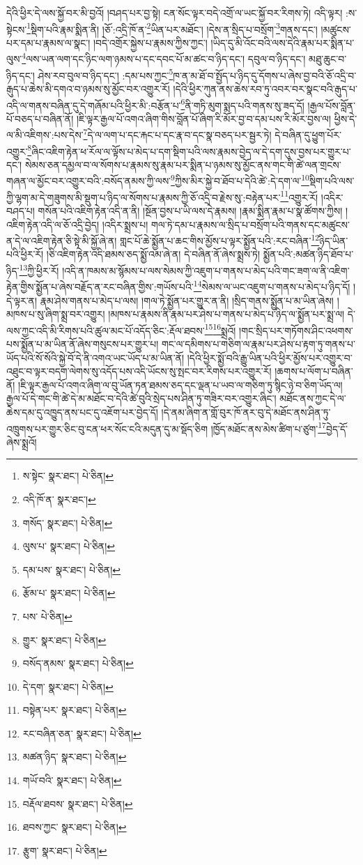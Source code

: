 དེའི་ཕྱིར་དེ་ལས་སྐྱོ་བར་མི་བྱའོ། །བཤད་པར་བྱ་སྟེ། ངན་སོང་ལྟར་བདེ་འགྲོ་ལ་ཡང་སྐྱོ་བར་རིགས་ཏེ། འདི་ལྟར། :ས་སྟེངས་\footnote{ས་སྟེང་  སྣར་ཐང་།  པེ་ཅིན། }སྡིག་པའི་རྣམ་སྨིན་ནི། །ཅོ་:འདྲི་ཁོ་ན་\footnote{འདི་ཁོ་ན་  སྣར་ཐང་། }ཡིན་པར་མཐོང་། །དེས་ན་སྲིད་པ་བསྲོག་\footnote{གསོད་  སྣར་ཐང་།  པེ་ཅིན། }གནས་དང་། །མཚུངས་པར་དམ་པ་རྣམས་ལ་སྣང་། །བདེ་འགྲོར་སྐྱེས་པ་རྣམས་ཀྱིས་ཀྱང་། །ཡིད་དུ་མི་འོང་བའི་ལས་དེའི་རྣམ་པར་སྨིན་པ་ལུས་\footnote{ལུས་པ་  སྣར་ཐང་།  པེ་ཅིན། }ལས་ཡན་ལག་དང་ཉིང་ལག་ཉམས་པ་དང་དབང་པོ་མ་ཚང་བ་ཉིད་དང་། དབུལ་བ་ཉིད་དང་། མཐུ་ཆུང་བ་ཉིད་དང་། ཤེས་རབ་བུལ་བ་ཉིད་དང་། :དམ་པས་ཀྱང་\footnote{དམ་པས་  སྣར་ཐང་།  པེ་ཅིན། }ཁ་ན་མ་ཐོ་བ་སྤྱོད་པ་ཉིད་དུ་དོགས་པ་ཞེས་བྱ་བའི་ཅོ་འདྲི་བ་རྒུད་པ་ཆེས་མི་དགའ་བ་ཉམས་སུ་མྱོང་བར་འགྱུར་རོ། །དེའི་ཕྱིར་ཀུན་ནས་ཆེས་རབ་ཏུ་འབར་བར་སྣང་བའི་རྒུད་པ་འདི་ལ་གནས་བཞིན་དུ་དེ་གཞོམ་པའི་ཕྱིར་མི་:བརྩོན་པ་\footnote{རྩོམ་པ་  སྣར་ཐང་།  པེ་ཅིན། }ནི་གཏི་མུག་སྨད་པའི་གནས་སུ་ཟད་དོ། །རྒྱལ་པོས་བློན་པོ་བཅད་པ་བཞིན་ནོ། །ཇི་ལྟར་རྒྱལ་པོ་འགའ་ཞིག་གིས་བློན་པོ་ཞིག་རི་མོར་བྱ་བ་དམ་པས་རི་མོར་བྱས་ལ། ཕྱིས་དེ་ལ་མི་འཇིགས་:པས་དེས་\footnote{པས་  པེ་ཅིན། }དེ་ལ་ལག་པ་དང་རྐང་པ་དང་རྣ་བ་དང་སྣ་བཅད་པར་སྦྱར་ཏེ། དེ་བཞིན་དུ་ཕྱུག་པོར་འགྱུར་\footnote{གྱུར་  སྣར་ཐང་།  པེ་ཅིན། }ཞིང་འཇིག་རྟེན་ཕ་རོལ་ལ་ལྟོས་པ་མེད་པ་དག་སྡིག་པའི་ལས་རྣམས་བྱེད་ལ་དེ་དག་དུས་བྱས་པར་གྱུར་པ་དང་། སེམས་ཅན་དམྱལ་བ་ལ་སོགས་པ་རྣམས་སུ་རྣམ་པར་སྨིན་པ་ཉམས་སུ་མྱོང་ནས་གང་གི་ཚེ་ལན་གྲངས་གཞན་ལ་མྱོང་བར་འགྱུར་བའི་:བསོད་ནམས་ཀྱི་ལས་\footnote{བསོད་ནམས་  སྣར་ཐང་།  པེ་ཅིན། }ཀྱིས་མིར་སྐྱེ་བ་ཐོབ་པ་དེའི་ཚེ་:དེ་དག་ལ་\footnote{དེ་དག་  སྣར་ཐང་།  པེ་ཅིན། }སྡིག་པའི་ལས་ཀྱི་ལྷག་མ་དེ་གཟུགས་མི་སྡུག་པ་ཉིད་ལ་སོགས་པ་རྣམས་ཀྱི་ཅོ་འདྲི་བ་རྗེས་སུ་:བརྟེན་པར་\footnote{བསྟེན་པར་  སྣར་ཐང་།  པེ་ཅིན། }འགྱུར་རོ། །འདིར་བཤད་པ། གསོན་པའི་འཇིག་རྟེན་འདི་ན་ནི། །སྔོན་བྱས་པ་ཡི་ལས་དེ་རྣམས། །རྣམ་སྨིན་རྣམ་པ་སྣ་ཚོགས་ཀྱིས། །འཇིག་རྟེན་འདི་ལ་ཅོ་འདྲི་བྱེད། །འདིར་སྨྲས་པ། གལ་ཏེ་དམ་པ་རྣམས་ལ་སྲིད་པ་བསྲོག་པའི་གནས་དང་མཚུངས་ན་དེ་ལ་འཇིག་རྟེན་ཅི་སྟེ་མི་སྐྱོ་ཞེ་ན། གླང་པོ་ཆེ་སྨྱོན་པ་ཆང་གིས་མྱོས་པ་ལྟར་སྨྱོན་པའི་:རང་བཞིན་\footnote{རང་བཞིན་ཅན་  སྣར་ཐང་།  པེ་ཅིན། }ཉིད་ཡིན་པའི་ཕྱིར་རོ། །ཅི་འཇིག་རྟེན་འདི་ཐམས་ཅད་སྨྱོ་འམ་ཞེ་ན། དེ་བཞིན་ནོ་ཞེས་སྨྲས་ཏེ། སྨྱོན་པའི་:མཚན་ཉིད་ཐོབ་པ་ཉིད་\footnote{མཚན་ཉིད་  སྣར་ཐང་།  པེ་ཅིན། }ཀྱི་ཕྱིར་རོ། །འདི་ན་ཁམས་མ་སྙོམས་པ་ལས་སེམས་ཀྱི་འཇུག་པ་གནས་པ་མེད་པའི་གང་ཟག་ལ་ནི་འཇིག་རྟེན་གྱིས་སྨྱོན་པ་ཞེས་བརྗོད་ན་རང་བཞིན་གྱིས་:གཡོས་པའི་\footnote{གཡོ་བའི་  སྣར་ཐང་།  པེ་ཅིན། }སེམས་ལ་ཡང་འཇུག་པ་གནས་པ་མེད་པ་ཉིད་དོ། །དེ་ལྟར་ན། རྣམ་ཤེས་གནས་པ་མེད་པ་ལས། །གལ་ཏེ་སྨྱོན་པར་གྱུར་ན་ནི། །སྲིད་གནས་སྨྱོན་པ་མ་ཡིན་ཞེས། །མཁས་པ་སུ་ཞིག་སྨྲ་བར་འགྱུར། །མཁས་པ་རྣམས་ནི་རྣམ་པར་ཤེས་པ་གནས་པ་མེད་པ་ཉིད་ལ་སྨྱོན་པར་སྨྲ་ལ། དེ་ལས་ཀྱང་འདི་མི་རིགས་པའི་ཚུལ་མང་པོ་འདོད་ཅིང་:རྡོལ་ཐབས་\footnote{བརྡོལ་ཐབས་  སྣར་ཐང་།  པེ་ཅིན། }\footnote{ཐབས་ཀྱང་  སྣར་ཐང་།  པེ་ཅིན། }སྨྲའོ། །གང་སྲིད་པར་གཏོགས་ཤིང་འཕགས་པས་སྨྱོན་པ་མ་ཡིན་ནོ་ཞེས་གསུངས་པར་གྱུར་པ། གང་ལ་དམིགས་པ་གཅིག་ལ་རྣམ་པར་ཤེས་པ་རྟག་ཏུ་གནས་པ་ཡོད་པའི་སོ་སོའི་སྐྱེ་བོ་དེ་ནི་འགའ་ཡང་ཡོད་པ་མ་ཡིན་ནོ། །དེའི་ཕྱིར་སྨྱོ་བའི་རྒྱུ་ཡིན་པའི་ཕྱིར་མྱོས་པར་འགྱུར་བ་འཐུང་བ་ལྟར་བདག་ལེགས་སུ་འདོད་པས་འདི་ཡོངས་སུ་སྤང་བར་རིགས་པར་འགྱུར་རོ། །ཆགས་པ་ལོག་པ་བཞིན་ནོ། །ཇི་ལྟར་རྒྱལ་པོ་འགའ་ཞིག་ལ་བུ་ཡོན་ཏན་ཐམས་ཅད་དང་ལྡན་པ་ཡབ་ལ་གཅིག་ཏུ་སྙིང་ཉེ་བ་ཅིག་ཡོད་ལ། རྒྱལ་པོ་དེ་གང་གི་ཚེ་དེ་མ་མཐོང་བ་དེའི་ཚེ་བུའི་སྲེད་པས་ཤིན་ཏུ་གཟིར་བར་འགྱུར་ཞིང་། མཐོང་ནས་ཀྱང་དེ་ལ་ཆེས་དམ་དུ་འཁྱུད་ནས་པང་དུ་འཇོག་པར་བྱེད་དོ། །དེ་ནམ་ཞིག་ན་གློ་བུར་ཁོ་ནར་བུ་དེ་མཐོང་ནས་ཤིན་ཏུ་འཁྲུགས་པར་གྱུར་ཅིང་བུ་ངན་ཕར་སོང་ངའི་མདུན་དུ་མ་སྡོད་ཅིག །ཁྱོད་མཐོང་ནས་མེས་ཚིག་པ་ཙུག་\footnote{རྩུག་  སྣར་ཐང་།  པེ་ཅིན། }བྱེད་དོ་ཞེས་སྨྲའོ། 